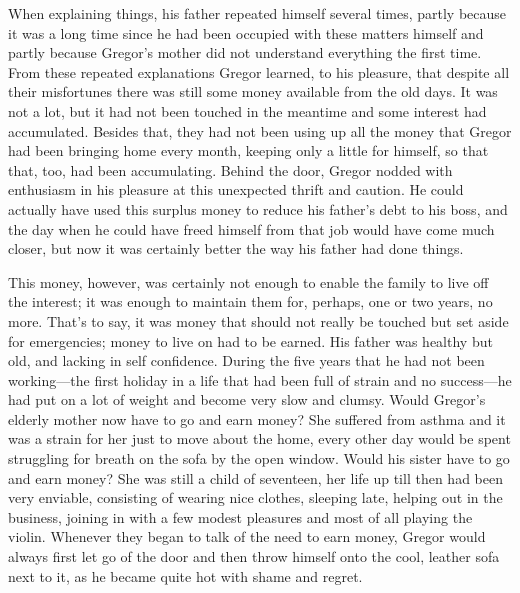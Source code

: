 When explaining things, his father repeated himself several times,
partly because it was a long time since he had been occupied with these
matters himself and partly because Gregor’s mother did not understand
everything the first time. From these repeated explanations Gregor
learned, to his pleasure, that despite all their misfortunes there was
still some money available from the old days. It was not a lot, but it
had not been touched in the meantime and some interest had accumulated.
Besides that, they had not been using up all the money that Gregor had
been bringing home every month, keeping only a little for himself, so
that that, too, had been accumulating. Behind the door, Gregor nodded
with enthusiasm in his pleasure at this unexpected thrift and caution.
He could actually have used this surplus money to reduce his father’s
debt to his boss, and the day when he could have freed himself from
that job would have come much closer, but now it was certainly better
the way his father had done things.

This money, however, was certainly not enough to enable the family to
live off the interest; it was enough to maintain them for, perhaps, one
or two years, no more. That’s to say, it was money that should not
really be touched but set aside for emergencies; money to live on had
to be earned. His father was healthy but old, and lacking in self
confidence. During the five years that he had not been working—the
first holiday in a life that had been full of strain and no success—he
had put on a lot of weight and become very slow and clumsy. Would
Gregor’s elderly mother now have to go and earn money? She suffered
from asthma and it was a strain for her just to move about the home,
every other day would be spent struggling for breath on the sofa by the
open window. Would his sister have to go and earn money? She was still
a child of seventeen, her life up till then had been very enviable,
consisting of wearing nice clothes, sleeping late, helping out in the
business, joining in with a few modest pleasures and most of all
playing the violin. Whenever they began to talk of the need to earn
money, Gregor would always first let go of the door and then throw
himself onto the cool, leather sofa next to it, as he became quite hot
with shame and regret.

